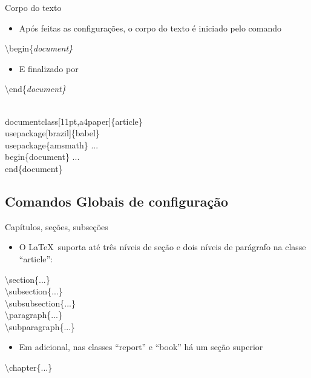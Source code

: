 \documentclass{beamer}
\begin{document}
\begin{frame}[fragile]{Corpo do texto}
    \begin{itemize}
    \item Após feitas as configurações, o corpo do texto é iniciado pelo comando
    \end{itemize}

    \alert{\textbackslash begin\{\it document\}}
    
    \begin{itemize}
    \item E finalizado por
    \end{itemize}

    \alert{\textbackslash end\{\it document\}}

    \begin{example}
        \begin{semiverbatim}
\\documentclass[11pt,a4paper]\{article\}
\\usepackage[brazil]\{babel\}
\\usepackage\{amsmath\}
...
\\begin\{document\}
...
\\end\{document\}
\end{semiverbatim}
    \end{example}
\end{frame}

\subsection{Comandos Globais de configuração}

\begin{frame}{Capítulos, seções, subseções}
    \begin{itemize}
    \item O \LaTeX\ suporta até três níveis de seção e dois níveis de parágrafo na classe ``article'':
    \end{itemize}
    
    \alert{\textbackslash section\{...\} \\
           \textbackslash subsection\{...\} \\
           \textbackslash subsubsection\{...\} \\
           \textbackslash paragraph\{...\} \\
           \textbackslash subparagraph\{...\} \\
        }
    
    \begin{itemize}
    \item Em adicional, nas classes ``report'' e ``book'' há um seção superior
    \end{itemize}

    \alert{\textbackslash chapter\{...\}}
\end{frame}
\end{document}
